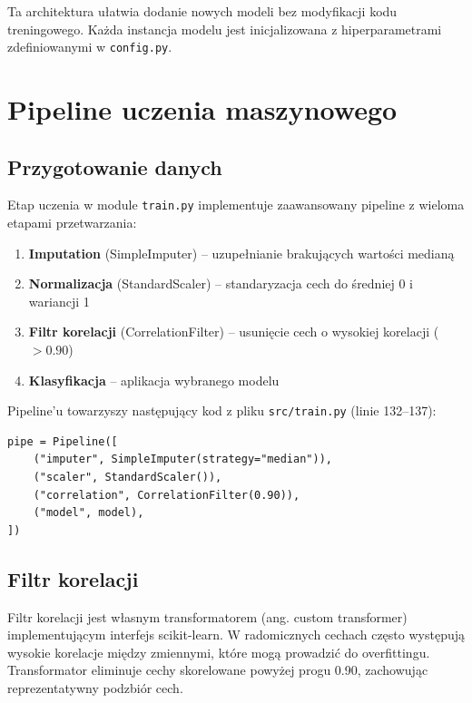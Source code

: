 \documentclass[12pt]{article}
\begin{document}
\noindent
Ta architektura ułatwia dodanie nowych modeli bez modyfikacji kodu treningowego. Każda instancja modelu jest inicjalizowana z hiperparametrami zdefiniowanymi w \texttt{config.py}.

\section{Pipeline uczenia maszynowego}

\subsection{Przygotowanie danych}

Etap uczenia w module \texttt{train.py} implementuje zaawansowany pipeline z wieloma etapami przetwarzania:

\begin{enumerate}
    \item \textbf{Imputation} (SimpleImputer) – uzupełnianie brakujących wartości medianą
    \item \textbf{Normalizacja} (StandardScaler) – standaryzacja cech do średniej 0 i wariancji 1
    \item \textbf{Filtr korelacji} (CorrelationFilter) – usunięcie cech o wysokiej korelacji ($> 0.90$)
    \item \textbf{Klasyfikacja} – aplikacja wybranego modelu
\end{enumerate}

\noindent
Pipeline'u towarzyszy następujący kod z pliku \texttt{src/train.py} (linie 132--137):

\begin{lstlisting}[caption={\texttt{src/train.py} (linie 132--137): Definicja pipeline'u przetwarzania}]
pipe = Pipeline([
    ("imputer", SimpleImputer(strategy="median")),
    ("scaler", StandardScaler()),
    ("correlation", CorrelationFilter(0.90)),
    ("model", model),
])
\end{lstlisting}

\subsection{Filtr korelacji}

\begin{tcolorbox}[colframe=green!75!black, colback=green!10, title={\large Redukcja wymiarowości radiomicznej}, fonttitle=\bfseries]
Filtr korelacji jest własnym transformatorem (ang. custom transformer) implementującym interfejs scikit-learn. W radomicznych cechach często występują wysokie korelacje między zmiennymi, które mogą prowadzić do overfittingu. Transformator eliminuje cechy skorelowane powyżej progu 0.90, zachowując reprezentatywny podzbiór cech.
\end{tcolorbox}
\end{document}
